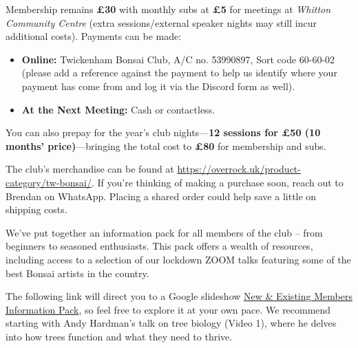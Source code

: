 
\label{2025-01-news}


\noindent
Membership remains \textbf{£30} with monthly subs at \textbf{£5} for meetings at \emph{Whitton Community Centre} (extra sessions/external speaker nights may still incur additional costs). Payments can be made:
	
\begin{itemize}
	\item \textbf{Online:} Twickenham Bonsai Club, A/C no. 53990897, Sort code 60-60-02 (please add a reference against the payment to help us identify where your payment has come from and log it via the Discord form as well).		
	\item \textbf{At the Next Meeting:} Cash or contactless.  
\end{itemize}
	
You can also prepay for the year's club nights—\textbf{12 sessions for £50 (10 months' price)}—bringing the total cost to \textbf{£80} for membership and subs.
	
\noindent
The club's merchandise can be found at \url{https://overrock.uk/product-category/tw-bonsai/}. If you're thinking of making a purchase soon, reach out to Brendan on WhatsApp. Placing a shared order could help save a little on shipping costs.
	
\noindent
We've put together an information pack for all members of the club – from beginners to seasoned enthusiasts. This pack offers a wealth of resources, including access to a selection of our lockdown ZOOM talks featuring some of the best Bonsai artists in the country.

The following link will direct you to a Google slideshow \href{https://docs.google.com/presentation/d/1L5SRA_ZSvnGMLbRt0CSf-Uz7BaiOfxOs7OUHMM_XrTY/edit?usp=sharing}{New \& Existing Members Information Pack}, so feel free to explore it at your own pace. We recommend starting with Andy Hardman’s talk on tree biology (Video 1), where he delves into how trees function and what they need to thrive.

